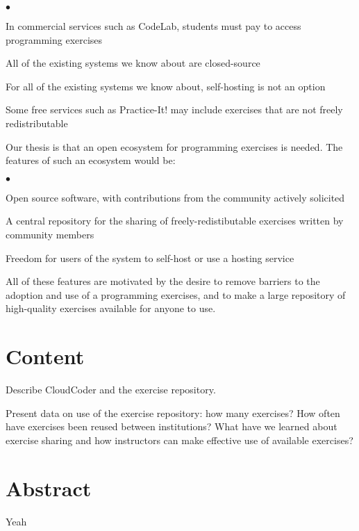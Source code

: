 \documentclass[11pt]{article}
\newenvironment{denseItemize}{%
\begin{list}{$\bullet$}{\setlength{\itemsep}{0in}\setlength{\parsep}{.05in}}}{\end{list}}
\begin{document}
\begin{denseItemize}
\item In commercial services such as CodeLab,
      students must pay to access programming exercises
\item All of the existing systems we know about are closed-source
\item For all of the existing systems we know about,
      self-hosting is not an option
\item Some free services such as Practice-It! may include
      exercises that are not freely redistributable
\end{denseItemize}

Our thesis is that an open ecosystem for programming exercises
is needed.  The features of such an ecosystem would be:

\begin{denseItemize}
\item Open source software, with contributions from the community
      actively solicited
\item A central repository for the sharing of freely-redistibutable exercises
      written by community members
\item Freedom for users of the system to self-host or use a hosting service
\end{denseItemize}

All of these features are motivated by the desire to remove 
barriers to the adoption and use of a programming exercises,
and to make a large repository of high-quality exercises available
for anyone to use.

\section*{Content}

Describe CloudCoder and the exercise repository.

Present data on use of the exercise repository: how many exercises? How often have exercises
been reused between institutions?  What have we learned about exercise sharing and how
instructors can make effective use of available exercises?

\section*{Abstract}

Yeah
\end{document}
